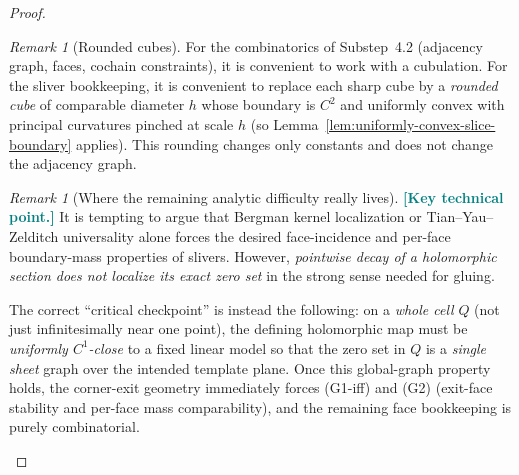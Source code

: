 \documentclass[11pt]{article}
\newcommand{\REVMZ}[1]{\textcolor{teal}{#1}}  %
\numberwithin{equation}{section}  %
\theoremstyle{plain}
\theoremstyle{definition}
\theoremstyle{remark}
\newtheorem{remark}[theorem]{Remark}
\begin{document}
\begin{proof}
\begin{remark}[Rounded cubes]\label{rem:smooth-cells}
For the combinatorics of Substep~4.2 (adjacency graph, faces, cochain constraints), it is convenient to work with a cubulation.
For the sliver bookkeeping, it is convenient to replace each sharp cube by a \emph{rounded cube} of comparable diameter $h$ whose boundary is $C^2$
and uniformly convex with principal curvatures pinched at scale $h$ (so Lemma~\ref{lem:uniformly-convex-slice-boundary} applies).
This rounding changes only constants and does not change the adjacency graph.
\end{remark}

\begin{remark}[Where the remaining analytic difficulty really lives]\label{rem:bergman-not-enough}
\REVMZ{\textbf{[Key technical point.]}}
It is tempting to argue that Bergman kernel localization or Tian--Yau--Zelditch universality \REVMZ{\cite{Tian90,Zelditch98,Catlin99}} alone forces the desired
face-incidence and per-face boundary-mass properties of slivers.  However, \emph{pointwise decay of a holomorphic section does not
localize its exact zero set} in the strong sense needed for gluing.

\smallskip\noindent
The correct ``critical checkpoint'' is instead the following: on a \emph{whole cell} $Q$ (not just infinitesimally near one point),
the defining holomorphic map must be \emph{uniformly $C^1$-close} to a fixed linear model so that the zero set in $Q$ is a \emph{single sheet}
graph over the intended template plane.  Once this global-graph property holds, the corner-exit geometry immediately forces
(G1-iff) and (G2) (exit-face stability and per-face mass comparability), and the remaining face bookkeeping is purely combinatorial.
\end{remark}


\end{proof}
\end{document}
